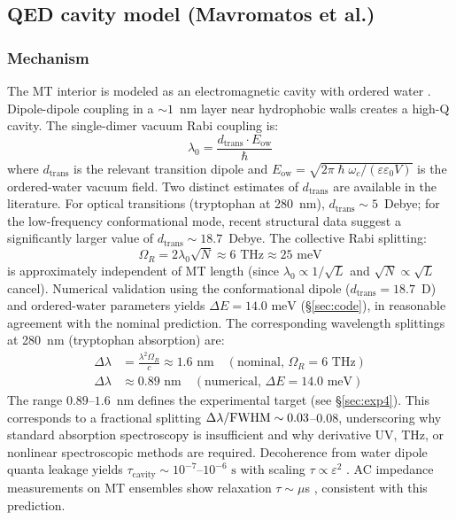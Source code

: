 \documentclass[twocolumn,10pt]{article}
\renewcommand{\hbar}{\hslash}
\newcommand{\meV}{\text{~meV}}
\newcommand{\THz}{\text{~THz}}
\begin{document}
\subsection{QED cavity model (Mavromatos et al.)}
\subsubsection{Mechanism}
The MT interior is modeled as an electromagnetic cavity with ordered water
\cite{DelGiudice1988,Sahu2013}. Dipole-dipole coupling in a $\sim 1$~nm
layer near hydrophobic walls creates a high-Q cavity. The single-dimer
vacuum Rabi coupling is:
\begin{equation}
\lambda_0 = \frac{d_{\text{trans}} \cdot E_{\text{ow}}}{\hbar}
\label{eq:lambda0}
\end{equation}
where $d_{\text{trans}}$ is the relevant transition dipole and
$E_{\text{ow}} = \sqrt{2\pi\hbar\omega_c/(\varepsilon\varepsilon_0 V)}$ is
the ordered-water vacuum field. Two distinct estimates of $d_{\text{trans}}$
are available in the literature. For optical transitions (tryptophan at
280~nm), $d_{\text{trans}} \sim 5$~Debye; for the low-frequency
conformational mode, recent structural data \cite{Nogales1998} suggest a
significantly larger value of $d_{\text{trans}} \sim 18.7$~Debye. The
collective Rabi splitting:
\begin{equation}
\Omega_R = 2\lambda_0\sqrt{N} \approx 6\THz \approx 25\meV
\label{eq:rabi_splitting}
\end{equation}
is approximately independent of MT length (since $\lambda_0 \propto
1/\sqrt{L}$ and $\sqrt{N} \propto \sqrt{L}$ cancel). Numerical validation
using the conformational dipole ($d_{\text{trans}} = 18.7$~D) and
ordered-water parameters yields $\Delta E = 14.0\meV$
(\S\ref{sec:code}), in reasonable agreement with the nominal prediction.
The corresponding wavelength splittings at 280~nm (tryptophan absorption)
are:
\begin{align}
\Delta\lambda &= \frac{\lambda^2 \Omega_R}{c}
\approx 1.6\text{~nm} \quad (\text{nominal, } \Omega_R = 6\THz) \label{eq:delta_lambda_nom} \\
\Delta\lambda &\approx 0.89\text{~nm}
\quad (\text{numerical, } \Delta E = 14.0\meV) \label{eq:delta_lambda_num}
\end{align}
The range $0.89\text{--}1.6$~nm defines the experimental target
(see \S\ref{sec:exp4}). This corresponds to a fractional splitting
\(\Delta\lambda/{\rm FWHM}\sim0.03\)--\(0.08\), underscoring why
standard absorption spectroscopy is insufficient and why derivative UV,
THz, or nonlinear spectroscopic methods are required.
Decoherence from water dipole quanta leakage yields
$\tau_{\text{cavity}} \sim 10^{-7}\text{--}10^{-6}\text{~s}$ with scaling
$\tau \propto \varepsilon^2$ \cite{Mavromatos2025}. AC impedance
measurements on MT ensembles show relaxation $\tau \sim \mu$s
\cite{Santelices2017}, consistent with this prediction.
\end{document}
